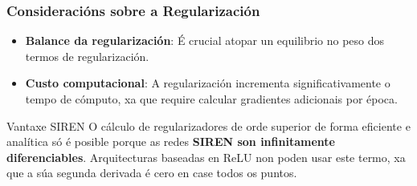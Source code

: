 \documentclass[xcolor=dvipsnames]{beamer}
\begin{document}
\begin{frame}
\frametitle{Consideracións sobre a Regularización}

\begin{itemize}
    \item \textbf{Balance da regularización}: É crucial atopar un equilibrio no peso dos termos de regularización.

    \vspace{0.4cm}
    \item \textbf{Custo computacional}: A regularización incrementa significativamente o tempo de cómputo, xa que require calcular gradientes adicionais por época.
\end{itemize}

\vfill

\begin{alertblock}{Vantaxe SIREN}
    O cálculo de regularizadores de orde superior de forma eficiente e analítica só é posible porque as redes \textbf{SIREN son infinitamente diferenciables}. Arquitecturas baseadas en ReLU non poden usar este termo, xa que a súa segunda derivada é cero en case todos os puntos.
\end{alertblock}


\end{frame}


\end{document}
